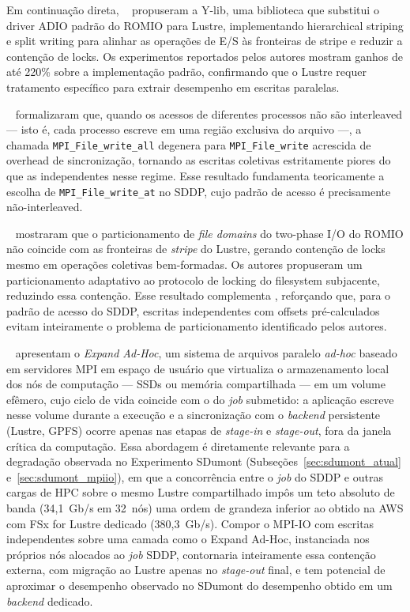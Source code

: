 Em continuação direta, \citeauthor{Dickens:10}~\cite{Dickens:10} propuseram a Y-lib,
uma biblioteca que substitui o driver ADIO padrão do ROMIO para Lustre, implementando
hierarchical striping e split writing para alinhar as operações de E/S às fronteiras
de stripe e reduzir a contenção de locks. Os experimentos reportados pelos autores
mostram ganhos de até 220\% sobre a implementação padrão, confirmando que o Lustre
requer tratamento específico para extrair desempenho em escritas paralelas.

\citeauthor{Gropp:08}~\cite{Gropp:08} formalizaram que, quando os acessos de
diferentes processos não são interleaved --- isto é, cada processo escreve em
uma região exclusiva do arquivo ---, a chamada \texttt{MPI\_File\_write\_all}
degenera para \texttt{MPI\_File\_write} acrescida de overhead de sincronização,
tornando as escritas coletivas estritamente piores do que as independentes nesse
regime. Esse resultado fundamenta teoricamente a escolha de
\texttt{MPI\_File\_write\_at} no SDDP, cujo padrão de acesso é precisamente
não-interleaved.

\citeauthor{Liao:08}~\cite{Liao:08} mostraram que o particionamento de
\textit{file domains} do two-phase I/O do ROMIO não coincide com as fronteiras
de \textit{stripe} do Lustre, gerando contenção de locks mesmo em operações
coletivas bem-formadas. Os autores propuseram um particionamento adaptativo
ao protocolo de locking do filesystem subjacente, reduzindo essa contenção.
Esse resultado complementa \cite{Dickens:08}, reforçando que, para o padrão
de acesso do SDDP, escritas independentes com offsets pré-calculados evitam
inteiramente o problema de particionamento identificado pelos autores.

\citeauthor{GarciaCarballeiraISPDC:23}~\cite{GarciaCarballeiraISPDC:23}
apresentam o \emph{Expand Ad-Hoc}, um sistema de arquivos paralelo
\textit{ad-hoc} baseado em servidores MPI em espaço de usuário que
virtualiza o armazenamento local dos nós de computação --- SSDs ou
memória compartilhada --- em um volume efêmero, cujo ciclo de vida
coincide com o do \textit{job} submetido: a aplicação escreve nesse
volume durante a execução e a sincronização com o \textit{backend}
persistente (Lustre, GPFS) ocorre apenas nas etapas de
\textit{stage-in} e \textit{stage-out}, fora da janela crítica da
computação. Essa abordagem é diretamente relevante para a
degradação observada no Experimento SDumont
(Subseções~\ref{sec:sdumont_atual} e~\ref{sec:sdumont_mpiio}), em
que a concorrência entre o \textit{job} do SDDP e outras cargas de
HPC sobre o mesmo Lustre compartilhado impôs um teto absoluto de
banda (34{,}1~Gb/s em 32~nós) uma ordem de grandeza inferior ao
obtido na AWS com FSx for Lustre dedicado (380{,}3~Gb/s). Compor o
MPI-IO com escritas independentes sobre uma camada como o Expand
Ad-Hoc, instanciada nos próprios nós alocados ao \textit{job} SDDP,
contornaria inteiramente essa contenção externa, com migração ao
Lustre apenas no \textit{stage-out} final, e tem potencial de
aproximar o desempenho observado no SDumont do desempenho obtido em
um \textit{backend} dedicado.